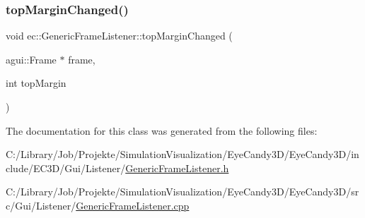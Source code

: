 \subsubsection{\texorpdfstring{top\+Margin\+Changed()}{topMarginChanged()}}
{\footnotesize\ttfamily void ec\+::\+Generic\+Frame\+Listener\+::top\+Margin\+Changed (\begin{DoxyParamCaption}\item[{agui\+::\+Frame $\ast$}]{frame,  }\item[{int}]{top\+Margin }\end{DoxyParamCaption})\hspace{0.3cm}{\ttfamily [override]}}



The documentation for this class was generated from the following files\+:\begin{DoxyCompactItemize}
\item 
C\+:/\+Library/\+Job/\+Projekte/\+Simulation\+Visualization/\+Eye\+Candy3\+D/\+Eye\+Candy3\+D/include/\+E\+C3\+D/\+Gui/\+Listener/\mbox{\hyperlink{_generic_frame_listener_8h}{Generic\+Frame\+Listener.\+h}}\item 
C\+:/\+Library/\+Job/\+Projekte/\+Simulation\+Visualization/\+Eye\+Candy3\+D/\+Eye\+Candy3\+D/src/\+Gui/\+Listener/\mbox{\hyperlink{_generic_frame_listener_8cpp}{Generic\+Frame\+Listener.\+cpp}}\end{DoxyCompactItemize}
